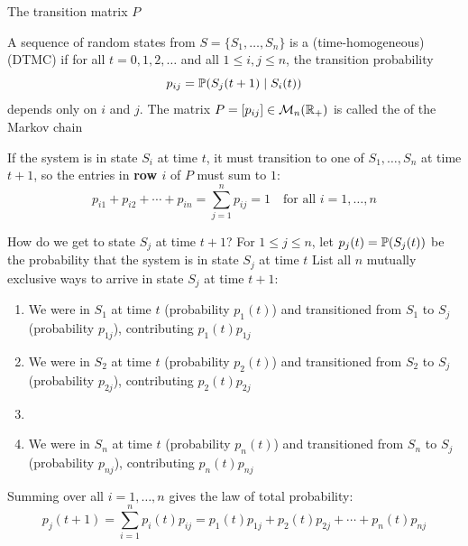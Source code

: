 \documentclass[aspectratio=169]{beamer}\usepackage[]{graphicx}\usepackage[]{xcolor}
\begin{document}
\begin{frame}{The transition matrix $P$}
\begin{importantdefinition}
A sequence of random states from $S = \{S_1, \ldots, S_n\}$ is a (time-homogeneous)  (DTMC) if for all $t = 0, 1, 2, \ldots$ and all $1 \le i, j \le n$, the transition probability
\[
p_{ij} = \mathbb{P}(S_j(t+1) \mid S_i(t))
\]
depends only on $i$ and $j$. The matrix $P = [p_{ij}] \in \mathcal{M}_n(\mathbb{R}_+)$ is called the  of the Markov chain
\end{importantdefinition}
\vfill
If the system is in state $S_i$ at time $t$, it must transition to one of $S_1, \ldots, S_n$ at time $t+1$, so the entries in \textbf{row $i$} of $P$ must sum to $1$:
\[
p_{i1} + p_{i2} + \cdots + p_{in} = \sum_{j=1}^n p_{ij} = 1 \quad \text{for all } i = 1, \ldots, n
\]
\end{frame}

\begin{frame}{How do we get to state $S_j$ at time $t+1$?}
For $1 \le j \le n$, let $p_j(t) = \mathbb{P}(S_j(t))$ be the probability that the system is in state $S_j$ at time $t$
\vfill
List all $n$ mutually exclusive ways to arrive in state $S_j$ at time $t+1$:
\begin{enumerate}
\item We were in $S_1$ at time $t$ (probability $p_1(t)$) and transitioned from $S_1$ to $S_j$ (probability $p_{1j}$), contributing $p_1(t) p_{1j}$
\item We were in $S_2$ at time $t$ (probability $p_2(t)$) and transitioned from $S_2$ to $S_j$ (probability $p_{2j}$), contributing $p_2(t) p_{2j}$
\item[$\vdots$]
\item[$n$.] We were in $S_n$ at time $t$ (probability $p_n(t)$) and transitioned from $S_n$ to $S_j$ (probability $p_{nj}$), contributing $p_n(t) p_{nj}$
\end{enumerate}
\vfill
Summing over all $i = 1, \ldots, n$ gives the law of total probability:
\[
p_j(t+1) = \sum_{i=1}^n p_i(t) p_{ij} = p_1(t)p_{1j} + p_2(t)p_{2j} + \cdots + p_n(t)p_{nj}
\]
\end{frame}
\end{document}
